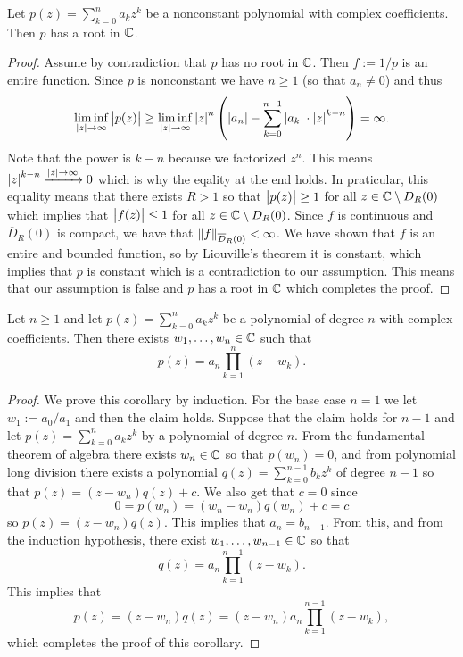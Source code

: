 \documentclass[11pt,a4paper]{article}
\begin{document}
\begin{corollary}
  Let $p(z) = \sum_{k=0}^{n} a_k z^k$ be a nonconstant polynomial with complex
  coefficients.
  Then $p$ has a root in $\mathbb{C}$.
\end{corollary}
\begin{proof}
  Assume by contradiction that $p$ has no root in $\mathbb{C}$.
  Then $f := 1 / p$ is an entire function.
  Since $p$ is nonconstant we have $n \geq 1$ (so that $a_n \neq 0$)
  and thus
  \[
    \liminf_{\abs{z} \to \infty} \abs{p(z)} \geq
    \liminf_{\abs{z} \to \infty} \abs{z}^{n}
    \del{\abs{a_n} - \sum_{k=0}^{n-1} \abs{a_k} \cdot \abs{z}^{k-n}} = \infty.
  \]
  Note that the power is $k - n$ because we factorized $z^n$.
  This means $\left\lvert z\right\rvert^{k - n} \xrightarrow{\left\lvert z\right\rvert \to \infty} 0$ which is
  why the eqality at the end holds.
  In praticular, this equality means that there exists $R > 1$ so that
  $\left\lvert p(z)\right\rvert \geq 1$ for all $z \in \mathbb{C} \setminus D_R(0)$ which implies that
  $\left\lvert f(z)\right\rvert \le 1$ for all $z \in \mathbb{C} \setminus D_R(0)$.
  Since $f$ is continuous and $\overline D_R(0)$ is compact,
  we have that $\left\lVert f\right\rVert_{\overline D_R(0)} < \infty$.
  We have shown that $f$ is an entire and bounded function,
  so by Liouville's theorem it is constant, which implies that
  $p$ is constant which is a contradiction to our assumption.
  This means that our assumption is false and $p$ has a root in $\mathbb{C}$
  which completes the proof.
\end{proof}

\begin{corollary}
  Let $n \geq 1$ and let $p(z) = \sum_{k=0}^{n} a_k z^k$ be a polynomial
  of degree $n$ with complex coefficients.
  Then there exists $w_1,\dots,w_n \in \mathbb{C}$ such that
  \[
    p(z) = a_n \prod_{k=1}^{n} (z - w_k).
  \]
\end{corollary}
\begin{proof}
  We prove this corollary by induction.
  For the base case $n = 1$ we let $w_1 := a_0 / a_1$ and then the claim
  holds.
  Suppose that the claim holds for $n - 1$ and let
  $p(z) = \sum_{k=0}^{n} a_k z^k$ by a polynomial of degree $n$.
  From the fundamental theorem of algebra there exists $w_n \in \mathbb{C}$ so
  that $p(w_n) = 0$, and from polynomial long division there exists
  a polynomial $q(z) = \sum_{k=0}^{n-1} b_k z^k$ of degree $n - 1$
  so that $p(z) = (z - w_n) q(z) + c$.
  We also get that $c = 0$ since
  \[
    0 = p(w_n) = (w_n - w_n) q(w_n) + c = c
  \]
  so $p(z) = (z - w_n) q(z)$.
  This implies that $a_n = b_{n-1}$.
  From this, and from the induction hypothesis, there exist
  $w_1,\dots,w_{n-1} \in \mathbb{C}$ so that
  \[
    q(z) = a_n \prod_{k=1}^{n-1} (z - w_k).
  \]
  This implies that
  \[
    p(z) = (z - w_n) q(z) = (z - w_n) a_n \prod_{k=1}^{n-1} (z - w_k),
  \]
  which completes the proof of this corollary.
\end{proof}
\end{document}
